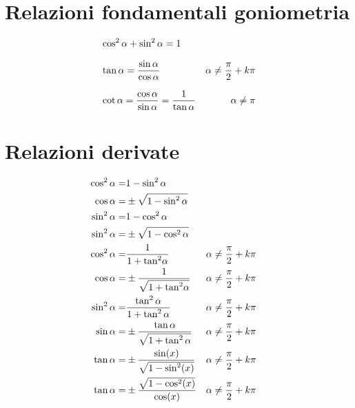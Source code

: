 \section{Relazioni fondamentali goniometria}\label{sec:relazioni-fondamentali-goniometria}
\begin{align*}	
	&\cos^{2}\alpha+\sin^{2}\alpha=1\\[.25cm]\index{Goniometria!relazione!fondamentale}
	&\tan\alpha={}\dfrac{\sin\alpha}{\cos\alpha}&\alpha\neq\dfrac{\pi}{2}+k\pi\\[.25cm]\index{Tangente!definizione}
	&\cot\alpha={}\dfrac{\cos\alpha}{\sin\alpha}={}\dfrac{1}{\tan\alpha}&\alpha\neq\pi\index{Cotangente!definizione}
\end{align*}
\section{Relazioni derivate}\label{sec:relazioni-derivate}
\begin{align*}
\cos^{2}\alpha=&{}1-\sin^{2}\alpha\\\index{Coseno!dato!seno}
\cos\alpha=&{}\pm\sqrt{1-\sin^{2}\alpha}\\
\sin^{2}\alpha=&{}1-\cos^{2}\alpha \\\index{Seno!dato!coseno}
\sin^{2}\alpha=&{}\pm\sqrt{1-\cos^{2}\alpha}\\
\cos^{2}\alpha=&{}\dfrac{1}{1+{\tan}^{2}\alpha} &&\alpha\neq\dfrac{\pi}{2}+k\pi\\
\cos\alpha=&{}\pm\dfrac{1}{\sqrt{1+{\tan}^{2}\alpha}} &&\alpha\neq\dfrac{\pi}{2}+k\pi\\\index{Coseno!dato!tangente}
\sin^{2}\alpha=&{}\dfrac{\tan^{2}\alpha}{1+\tan^{2}\alpha}&&\alpha\neq\dfrac{\pi}{2}+k\pi\\
\sin\alpha=&{}\pm\dfrac{\tan\alpha}{\sqrt{1+\tan^{2}\alpha}}&&\alpha\neq\dfrac{\pi}{2}+k\pi\\\index{Seno!dato!tangente}
\tan\alpha=&{}\pm\dfrac{\sin(x)}{\sqrt{1-\sin^2(x)}}&&\alpha\neq\dfrac{\pi}{2}+k\pi\\\index{Tangente!dato!seno}
\tan\alpha=&{}\pm\dfrac{\sqrt{1-\cos^2(x)}}{\cos(x)}
&&\alpha\neq\dfrac{\pi}{2}+k\pi\index{Tangente!dato!coseno}
\end{align*}
